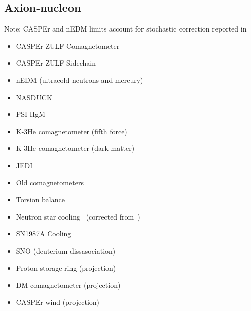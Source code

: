 \documentclass[9pt,twocolumn]{extarticle}
\begin{document}
\begin{mdframed}
\vspace{-1em}
\section{Axion-nucleon}\vspace{-0.5em}
Note: CASPEr and nEDM limits account for stochastic correction reported in~\cite{Centers:2019dyn}
\begin{itemize}\setlength\itemsep{-0.5em}
    \item CASPEr-ZULF-Comagnetometer~\cite{Wu:2019exd}
    \item CASPEr-ZULF-Sidechain~\cite{Garcon:2019inh}
    \item nEDM (ultracold neutrons and mercury)~\cite{Abel:2017rtm}
    \item NASDUCK~\cite{Bloch:2021vnn,Bloch:2022kjm}
    \item PSI HgM~\cite{Abel:2022vfg}
    \item K-3He comagnetometer (fifth force)~\cite{Vasilakis2009}
    \item K-3He comagnetometer (dark matter)~\cite{Lee:2022vvb}
    	\item JEDI~\cite{JEDI:2022hxa}
    \item Old comagnetometers~\cite{Bloch:2019lcy}
    \item Torsion balance~\cite{Adelberger:2006dh}
    \item Neutron star cooling~\cite{Buschmann:2021juv} (corrected from~\cite{Beznogov:2018fda})
    \item SN1987A Cooling~\cite{Carenza:2019pxu}
    \item SNO (deuterium dissasociation)~\cite{Bhusal:2020bvx}
    \item Proton storage ring (projection)~\cite{Graham:2020kai}
    \item DM comagnetometer (projection)~\cite{Bloch:2019lcy}
    \item CASPEr-wind (projection)~\cite{Garcon:2019inh}
\end{itemize}
\end{mdframed}

\newpage
\end{document}
